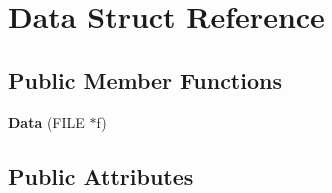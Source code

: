 \hypertarget{structData}{}\section{Data Struct Reference}
\label{structData}
\subsection*{Public Member Functions}
\begin{DoxyCompactItemize}
\item 
\mbox{\label{structData_a438cc083234ab745bdb241364f505459}} 
{\bfseries Data} (F\+I\+LE $\ast$f)
\end{DoxyCompactItemize}
\subsection*{Public Attributes}
